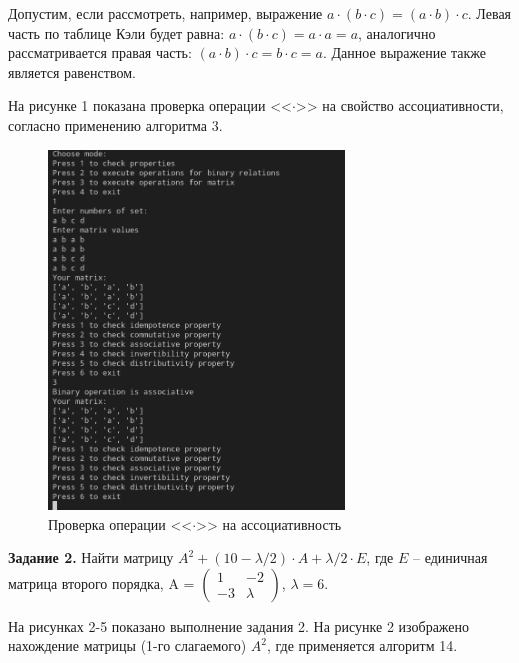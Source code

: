 \documentclass[bachelor, och, labwork]{shiza}
\begin{document}
        Допустим, если рассмотреть, например, выражение $a \cdot (b \cdot c) = (a \cdot b) \cdot c$. Левая часть по таблице Кэли будет равна: 
        $a \cdot (b \cdot c) = a \cdot a = a$, аналогично рассматривается правая часть:  $(a \cdot b) \cdot c = b \cdot c = a$. Данное выражение
        также является равенством.
        
        На рисунке 1 показана проверка операции <<$\cdot$>> на свойство ассоциативности, согласно применению алгоритма 3.
        
        \begin{figure}[H]
            \centering
            \includegraphics[width=0.7\textwidth]{photo/1.png}
            \caption{Проверка операции <<$\cdot$>> на ассоциативность}
        \end{figure}

        \textbf{Задание 2.} Найти матрицу $A^2 + (10 - \lambda / 2) \cdot A + \lambda / 2 \cdot E$, где $E$ -- единичная матрица
        второго порядка, A =
        $\begin{pmatrix}
            1 & -2 \\
            -3 & \lambda
        \end{pmatrix}$, $\lambda = 6$.

        На рисунках 2-5 показано выполнение задания 2.
        На рисунке 2 изображено нахождение матрицы (1-го слагаемого) $A^2$, где применяется алгоритм 14.
        
\end{document}
